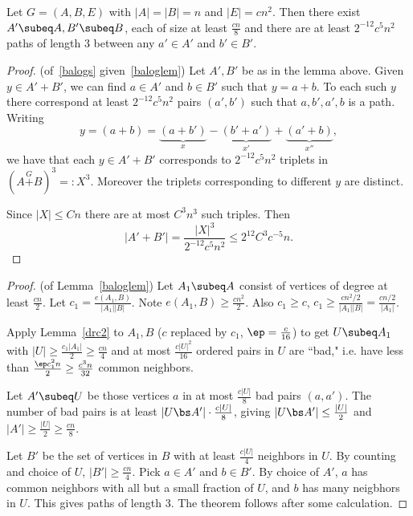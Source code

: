 \begin{lem}\label{baloglem} 
Let $G=(A,B,E)$ with $|A|=|B|=n$ and $|E|=cn^2$. Then there exist $A'\subeq A, B'\subeq B$, each of size at least $\frac{cn}8$ and there are at least $2^{-12} c^5n^2$ paths of length 3 between any $a'\in A'$ and $b'\in B'$.
\end{lem}
\begin{proof}(of~\ref{balogs} given~\ref{baloglem})
Let $A',B'$ be as in the lemma above. %
Given $y\in A'+B'$, we can find $a\in A'$ and $b\in B'$ such that $y=a+b$. To each such $y$ there correspond at least $2^{-12}c^5 n^2$ pairs $(a',b')$ such that $a,b',a', b$ is a path. Writing
\[y=(a+b)=\underbrace{(a+b')}_x-\underbrace{(b'+a')}_{x'}+ \underbrace{(a'+b)}_{x''},\]
we have that each $y\in A'+B'$ corresponds to $2^{-12}c^5n^2$ triplets in $(A\stackrel{G}{+}B)^3=:X^3$. Moreover the triplets corresponding to different $y$ are distinct.

Since $|X|\le Cn$ there are at most $C^3n^3$ such triples. Then %
\[
|A'+B'|=\frac{|X|^3}{2^{-12}c^5n^2}\le 2^{12}C^3 c^{-5}n.
\]
\end{proof}
\begin{proof} (of Lemma~\ref{baloglem})
Let $A_1\subeq A$ consist of vertices of degree at least $\frac{cn}{2}$. Let $c_1=\frac{e(A_1,B)}{|A_1||B|}$. Note $e(A_1,B)\ge \frac{cn^2}{2}$. Also $c_1\ge c$, $c_1\ge \frac{cn^2/2}{|A_1||B|}=\frac{cn/2}{|A_1|}$. 

Apply Lemma~\ref{drc2} to $A_1,B$ ($c$ replaced by $c_1$, $\ep=\frac{c}{16}$) 
to get $U\subeq A_1$ with $|U|\ge \frac{c_1|A_1|}{2}\ge \frac{cn}{4}$ and at most $\frac{c|U|^2}{16}$ ordered pairs in $U$ are ``bad," i.e. have less than $\frac{\ep c_1^2n}{2}\ge \frac{c^3n}{32}$ common neighbors.

Let $A'\subeq U$ be those vertices $a$ in at most $\frac{c|U|}8$ bad pairs $(a,a')$. %
The number of bad pairs is at least $|U\bs A'|\cdot\frac{c|U|}8$, giving $|U\bs A'|\le \frac{|U|}{2}$ and $|A'|\ge\frac{|U|}{2}\ge\frac{cn}8$.

Let $B'$ be the set of vertices in $B$ with at least $\frac{c|U|}4$ neighbors in $U$. 
By counting and choice of $U$, $|B'|\ge\frac{cn}4$. 
Pick $a\in A'$ and $b\in B'$. By choice of $A'$, $a$ has common neighbors with all but a small fraction of $U$, and $b$ has many neigbhors in $U$. This gives paths of length 3. The theorem follows after some calculation.


\end{proof}